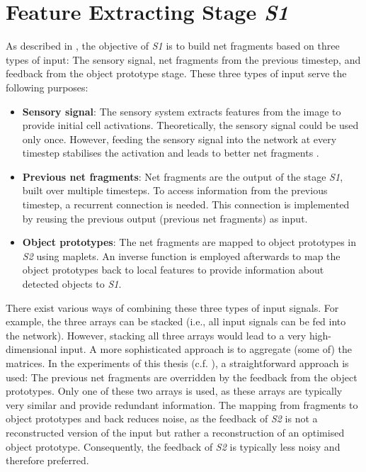 \section{Feature Extracting Stage \emph{S1}}
As described in , the objective of \emph{S1} is to build net fragments based on three types of input: The sensory signal, net fragments from the previous timestep, and feedback from the object prototype stage.
These three types of input serve the following purposes:
\begin{itemize}
    \item \textbf{Sensory signal}: The sensory system extracts features from the image to provide initial cell activations. Theoretically, the sensory signal could be used only once. However, feeding the sensory signal into the network at every timestep stabilises the activation and leads to better net fragments .
    \item \textbf{Previous net fragments}: Net fragments are the output of the stage \emph{S1}, built over multiple timesteps.
    To access information from the previous timestep, a recurrent connection is needed. This connection is implemented by reusing the previous output (previous net fragments) as input.
    \item \textbf{Object prototypes}: The net fragments are mapped to object prototypes in \emph{S2} using maplets. An inverse function is employed afterwards to map the object prototypes back to local features to provide information about detected objects to \emph{S1}.
\end{itemize}

There exist various ways of combining these three types of input signals. For example, the three arrays can be stacked (i.e., all input signals can be fed into the network).
However, stacking all three arrays would lead to a very high-dimensional input.
A more sophisticated approach is to aggregate (some of) the matrices.
In the experiments of this thesis (c.f. ), a straightforward approach is used: The previous net fragments are overridden by the feedback from the object prototypes.
Only one of these two arrays is used, as these arrays are typically very similar and provide redundant information. The mapping from fragments to object prototypes and back reduces noise, as the feedback of \emph{S2} is not a reconstructed version of the input but rather a reconstruction of an optimised object prototype. Consequently, the feedback of \emph{S2} is typically less noisy and therefore preferred.

